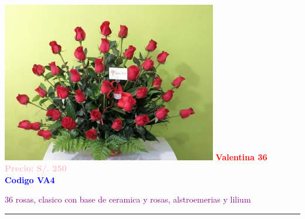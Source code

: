 \begin{multicols}{2}
    \begin{minipage}{\linewidth}
        \centering
        \includegraphics[height=7cm]{imagenes_extraidas/image_11_3} %
        \newline
        \vspace{0.1cm}
        \textbf{\Large \textcolor{red}{Valentina 36}} \\ %
        \vspace{0.2cm}
        \textbf{\textcolor{pink}{Precio: S/. 250}} \\ %
        \vspace{0.2cm}
        \textbf{\textcolor{blue}{Codigo VA4}} \\ %
        \vspace{0.2cm}
        \begin{minipage}{0.8\linewidth} 
            \small \textcolor{purple}{36 rosas, clasico con base de ceramica y rosas, alstroemerias y lilium} %
        \end{minipage}
        \vspace{0.1cm}        
        \rule{\linewidth}{0.5pt}
    \end{minipage}
    

\end{multicols}
